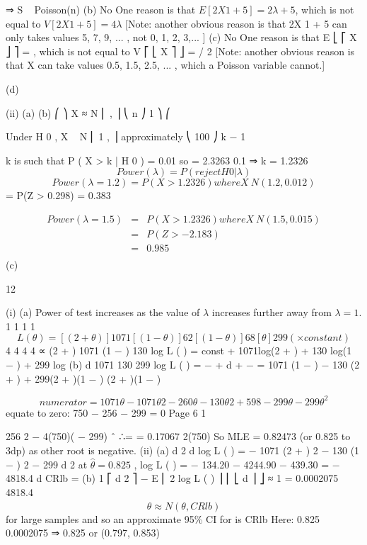 \documentclass[a4paper,12pt]{article}
\begin{document}
⇒ S ~ Poisson(n\lambda)
(b)
No
One reason is that $E[2X 1 + 5] = 2\lambda + 5$, which is not equal to $V[2X 1 + 5] = 4\lambda$
[Note: another obvious reason is that 2X 1 + 5 can only takes values 5,
7, 9, ... , not 0, 1, 2, 3,... ]
(c)
No
One reason is that E ⎣ ⎡ X ⎦ ⎤ = \lambda , which is not equal to V ⎡ ⎣ X ⎤ ⎦ = \lambda / 2
[Note: another obvious reason is that X can take values 0.5, 1.5, 2.5, ... , which a Poisson variable cannot.]

(d)
\item (ii)
(a)
(b)
⎛ \lambda ⎞
X ≈ N ⎜ \lambda , ⎟
⎝ n ⎠
1 ⎞
⎛

Under H 0 , X ~ N ⎜ 1 ,
⎟ approximately
⎝ 100 ⎠
k − 1

k is such that P ( X > k | H 0 ) = 0.01 so
= 2.3263
0.1
⇒ k = 1.2326
\[Power(\lambda) = P(reject H 0 |\lambda)\]
\[Power(\lambda = 1.2) = P ( X > 1.2326 ) where X ~ N (1.2, 0.012)\]
= P(Z > 0.298) = 0.383

\begin{eqnarray*}
Power(\lambda = 1.5) &=& P ( X > 1.2326 ) where X ~ N (1.5, 0.015)\\
&=& P(Z > −2.183)\\ &=& 0.985\\
\end{eqnarray*}
(c)

12
\item (i)
(a)
Power of test increases as the value of $\lambda$ increases further away from
$\lambda = 1$.
1
1
1
1
\[L ( \theta ) = [ (2 + \theta )] 1071 [ (1 − \theta )] 62 [ (1 − \theta )] 68 [ \theta ] 299 (× constant)\]
4
4
4
4
∝ (2 + \theta ) 1071 (1 − \theta ) 130 
log L ( \theta ) = const + 1071log(2 + \theta ) + 130 log(1 − \theta ) + 299 log \theta
(b)
d
1071 130 299
log L ( \theta ) =
−
+
d  +  − \theta
\theta
=
1071 \theta (1 − \theta ) − 130 \theta (2 + \theta ) + 299(2 + \theta )(1 − \theta )
(2 + \theta )(1 − \theta ) \theta

\[numerator = 1071 \theta − 1071 \theta 2 − 260 \theta − 130 \theta 2 + 598 − 299 \theta − 299 \theta^2\]
equate to zero: 750  − 256 \theta − 299 = 0
Page 6
1

256  2 − 4(750)( − 299)
ˆ
∴\theta =
= 0.17067 
2(750)
So MLE \hat{\theta} = 0.82473 (or 0.825 to 3dp) as other root is negative.
(ii)
(a)
d 2
d 
log L ( \theta ) = −
1071
(2 + \theta )
2
−
130
(1 − \theta )
2
−
299
d 2
at $\hat{\theta} = 0.825$ ,
log L ( \theta ) = − 134.20 − 4244.90 − 439.30 = − 4818.4
d 
CRlb =
(b)
1
⎡ d 2
⎤
− E ⎢ 2 log L ( \theta ) ⎥
⎢ ⎣ d \theta
⎥ ⎦
≈
1
= 0.0002075
4818.4
\[\hat{\theta} ≈ N ( \theta , CRlb )\] for large samples
and so an approximate 95\% CI for \theta is \hat{\theta}  CRlb
Here: 0.825  0.0002075 ⇒ 0.825  or (0.797, 0.853)
\end{document}
